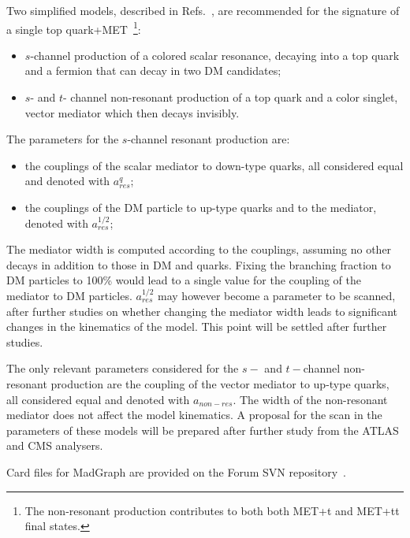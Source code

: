 \documentclass[a4,debug,notitlepage,nobib]{tufte-handout}
\newif\ifCMS
\begin{document}
\ifCMS
\textbf{[Open point: Add here implementation details for CMS..]}
\fi


Two simplified models, described in Refs.~\cite{Andrea:2011ws,Boucheneb:2014wza}, are recommended 
for the signature of a single top quark+MET~\footnote{The non-resonant production 
contributes to both both MET+t and MET+tt final states.}:

\begin{itemize}
\item $s$-channel production of a colored scalar resonance, decaying into a top quark and a fermion
that can decay in two DM candidates;
\item $s$- and $t$- channel non-resonant production of a top quark and a color singlet, vector mediator which then decays invisibly.
\end{itemize}

The parameters for the $s$-channel resonant production are:
\begin{itemize}
 \item the couplings of the scalar mediator to down-type quarks, all considered equal and denoted with $a_{res}^q$;
 \item the couplings of the DM particle to up-type quarks and to the mediator, denoted with $a_{res}^{1/2}$;
\end{itemize}
The mediator width is computed according to the couplings, assuming no other decays in addition
to those in DM and quarks. Fixing the branching fraction to DM particles to 100\% would lead 
to a single value for the coupling of the mediator to DM particles. $a_{res}^{1/2}$ 
may however become a parameter to be scanned, after further studies on whether changing 
the mediator width leads to significant changes in the kinematics of the model. 
This point will be settled after further studies. 

The only relevant parameters considered for the $s-$ and $t-$channel non-resonant production 
are the coupling of the vector mediator to up-type quarks, all considered equal and denoted with $a_{non-res}$. 
The width of the non-resonant mediator does not affect the model kinematics. 
A proposal for the scan in the parameters of these models will be prepared after further study 
from the ATLAS and CMS analysers. 

Card files for MadGraph are provided on the Forum SVN repository~\cite{ForumSVN_EWMonoTop}.
\end{document}
